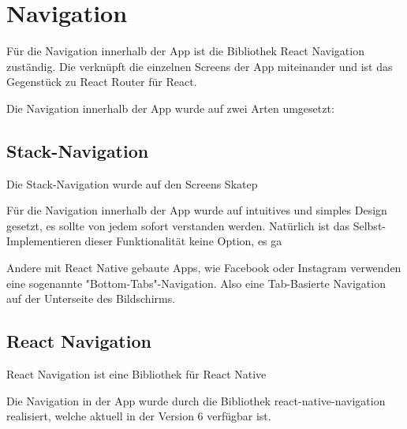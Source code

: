 \chapter{Navigation}
Für die Navigation innerhalb der App ist die Bibliothek React Navigation zuständig. Die verknüpft
die einzelnen Screens der App miteinander und ist das Gegenstück zu React Router für React.

Die Navigation innerhalb der App wurde auf zwei Arten umgesetzt:

\section{Stack-Navigation}
Die Stack-Navigation wurde auf den Screens Skatep


Für die Navigation innerhalb der App wurde auf intuitives und simples Design gesetzt, es sollte von
jedem sofort verstanden werden. Natürlich ist das Selbst-Implementieren dieser Funktionalität keine
Option, es ga


Andere mit React Native gebaute Apps, wie Facebook oder Instagram
verwenden eine sogenannte "Bottom-Tabs"-Navigation. Also eine Tab-Basierte Navigation auf der
Unterseite des Bildschirms.

\section{React Navigation}
React Navigation ist eine Bibliothek für React Native


Die Navigation in der App wurde durch die Bibliothek react-native-navigation realisiert, welche
aktuell in der Version 6 verfügbar ist.